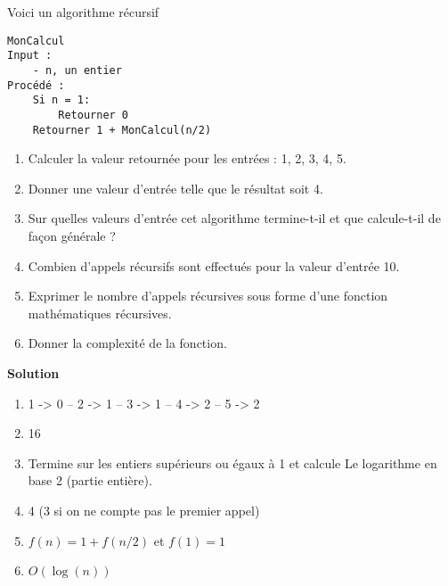
\begin{exercice}
Voici un algorithme récursif

\begin{lstlisting}
MonCalcul
Input :
    - n, un entier
Procédé :
    Si n = 1:
        Retourner 0
    Retourner 1 + MonCalcul(n/2)
\end{lstlisting}

\begin{enumerate}
\item Calculer la valeur retournée pour les entrées : 1, 2, 3, 4, 5.
\item Donner une valeur d'entrée telle que le résultat soit 4.
\item Sur quelles valeurs d'entrée cet algorithme termine-t-il et que calcule-t-il de façon générale ?
\item Combien d'appels récursifs sont effectués pour la valeur d'entrée 10.
\item Exprimer le nombre d'appels récursives sous forme d'une fonction mathématiques récursives.
\item Donner la complexité de la fonction.
\end{enumerate}

\textbf{Solution}

\begin{enumerate}
\item 1 -> 0 -- 2 -> 1 -- 3 -> 1 -- 4 -> 2 -- 5 -> 2
\item 16
\item Termine sur les entiers supérieurs ou égaux à 1 et calcule Le logarithme en base 2 (partie entière).
\item 4 (3 si on ne compte pas le premier appel)
\item $f(n) = 1 + f(n/2)$ et $f(1) = 1$ 
\item $O(\log(n))$
\end{enumerate}
\end{exercice}